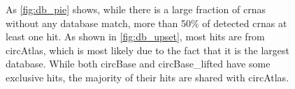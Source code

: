 \begin{figure}[H]
\begin{tabular}{cc}
    \end{tabular}
    \caption{As \cref{fig:db_pie} shows, while there is a large fraction of
        \glspl{crna} without any
        database match, more than 50\% of detected \glspl{crna} at least one
        hit.
        As shown in \cref{fig:db_upset}, most hits are from circAtlas, which is most
        likely due to the fact that it is the largest database.
        While both circBase and circBase\_lifted have some exclusive hits, the majority
        of their hits are shared with circAtlas.
    }
    \label{fig:db_agreement}
\end{figure}
